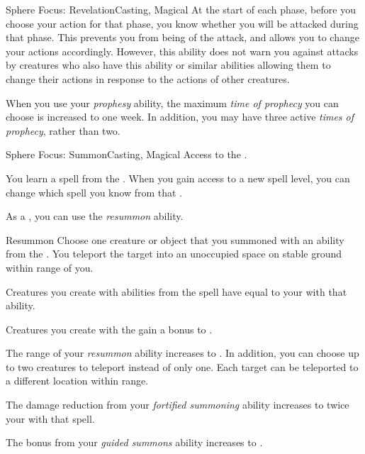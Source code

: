 \begin{feat}{Sphere Focus: Revelation}{Casting, Magical}
         At the start of each phase, before you choose your action for that phase, you know whether you will be attacked during that phase.
        This prevents you from being \unaware of the attack, and allows you to change your actions accordingly.
        However, this ability does not warn you against attacks by creatures who also have this ability or similar abilities allowing them to change their actions in response to the actions of other creatures.

         When you use your \textit{prophesy} ability, the maximum \textit{time of prophecy} you can choose is increased to one week.
        In addition, you may have three active \textit{times of prophecy}, rather than two.
    \end{feat}

    \begin{feat}{Sphere Focus: Summon}{Casting, Magical}
        \featpre Access to the  .

         You learn a spell from the  .
        When you gain access to a new spell level, you can change which spell you know from that .

         As a , you can use the \textit{resummon} ability.
        \begin{ability}{Resummon}
            Choose one creature or object that you summoned with an ability from the  .
            You teleport the target into an unoccupied space on stable ground within \rngmed range of you.
        \end{ability}

         Creatures you create with abilities from the  spell have  equal to your  with that ability.

         Creatures you create with the   gain a  bonus to .

         The range of your \textit{resummon} ability increases to \rnglong.
        In addition, you can choose up to two creatures to teleport instead of only one.
        Each target can be teleported to a different location within range.

         The damage reduction from your \textit{fortified summoning} ability increases to twice your  with that spell.

         The bonus from your \textit{guided summons} ability increases to .
    \end{feat}

